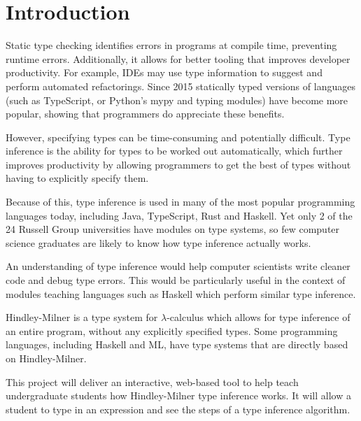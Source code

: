 \documentclass[12pt]{article}
\begin{document}
\maketitle

\section{Introduction}

Static type checking identifies errors in programs at compile time, preventing runtime errors. Additionally, it allows for better tooling that improves developer productivity. For example, IDEs may use type information to suggest and perform automated refactorings.\cite{ref1}\cite{ref2} Since 2015 statically typed versions of languages (such as TypeScript, or Python’s mypy and typing modules\cite{ref3}) have become more popular, showing that programmers do appreciate these benefits.

However, specifying types can be time-consuming and potentially difficult. Type inference is the ability for types to be worked out automatically, which further improves productivity by allowing programmers to get the best of types without having to explicitly specify them.

Because of this, type inference is used in many of the most popular programming languages today, including Java, TypeScript, Rust and Haskell. Yet only 2 of the 24 Russell Group universities have modules on type systems, so few computer science graduates are likely to know how type inference actually works.

An understanding of type inference would help computer scientists write cleaner code and debug type errors. This would be particularly useful in the context of modules teaching languages such as Haskell which perform similar type inference.

Hindley-Milner is a type system for $\lambda$-calculus which allows for type inference of an entire program, without any explicitly specified types. Some programming languages, including Haskell and ML, have type systems that are directly based on Hindley-Milner.

This project will deliver an interactive, web-based tool to help teach undergraduate students how Hindley-Milner type inference works. It will allow a student to type in an expression and see the steps of a type inference algorithm.




\end{document}

